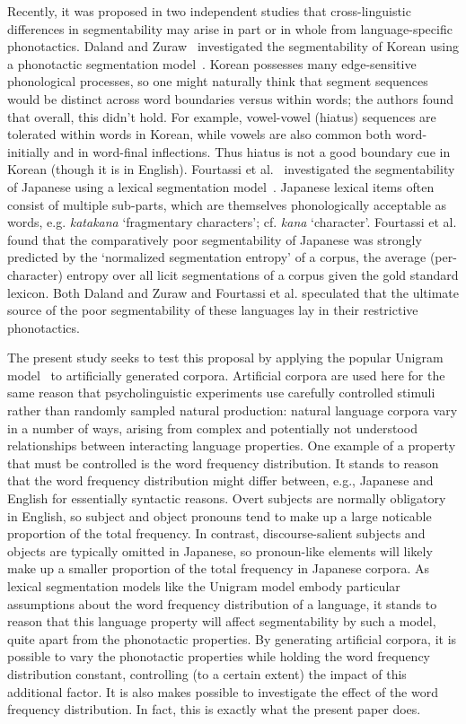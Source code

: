 \documentclass[11pt]{article}
\begin{document}
Recently, it was proposed in two independent studies that cross-linguistic differences in segmentability may arise in part or in whole from language-specific phonotactics. Daland and Zuraw~ investigated the segmentability of Korean using a phonotactic segmentation model~\cite{Daland11a}. Korean possesses many edge-sensitive phonological processes, so one might naturally think that segment sequences would be distinct across word boundaries versus within words; the authors found that overall, this didn't hold. For example, vowel-vowel (hiatus) sequences are tolerated within words in Korean, while vowels are also common both word-initially and in word-final inflections. Thus hiatus is not a good boundary cue in Korean (though it is in English). Fourtassi et al.~ investigated the segmentability of Japanese using a lexical segmentation model~\cite{Goldwater09a}. Japanese lexical items often consist of multiple sub-parts, which are themselves phonologically acceptable as words, e.g. \textit{katakana} `fragmentary characters'; cf. \textit{kana} `character'. Fourtassi et al. found that the comparatively poor segmentability of Japanese was strongly predicted by the `normalized segmentation entropy' of a corpus, the average (per-character) entropy over all licit segmentations of a corpus given the gold standard lexicon. Both Daland and Zuraw and Fourtassi et al. speculated that the ultimate source of the poor segmentability of these languages lay in their restrictive phonotactics.

The present study seeks to test this proposal by applying the popular Unigram model~\cite{Brent99a,Goldwater07c,Goldwater09a} to artificially generated corpora. Artificial corpora are used here for the same reason that psycholinguistic experiments use carefully controlled stimuli rather than randomly sampled natural production: natural language corpora vary in a number of ways, arising from complex and potentially not understood relationships between interacting language properties. One example of a property that must be controlled is the word frequency distribution. It stands to reason that the word frequency distribution might differ between, e.g., Japanese and English for essentially syntactic reasons. Overt subjects are normally obligatory in English, so subject and object pronouns tend to make up a large noticable proportion of the total frequency. In contrast, discourse-salient subjects and objects are typically omitted in Japanese, so pronoun-like elements will likely make up a smaller proportion of the total frequency in Japanese corpora. As lexical segmentation models like the Unigram model embody particular assumptions about the word frequency distribution of a language, it stands to reason that this language property will affect segmentability by such a model, quite apart from the phonotactic properties. By generating artificial corpora, it is possible to vary the phonotactic properties while holding the word frequency distribution constant, controlling (to a certain extent) the impact of this additional factor. It is also makes possible to investigate the effect of the word frequency distribution. In fact, this is exactly what the present paper does.
\end{document}
